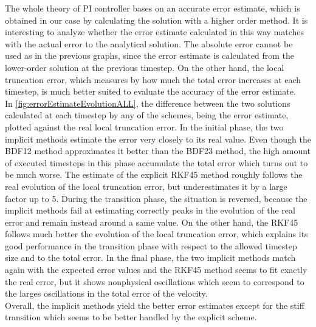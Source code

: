 The whole theory of PI controller bases on an accurate error estimate, which is obtained in our case by calculating the solution with a higher order method. It is interesting to analyze whether the error estimate calculated in this way matches with the actual error to the analytical solution. The absolute error cannot be used as in the previous graphs, since the error estimate is calculated from the lower-order solution at the previous timestep. On the other hand, the local truncation error, which measures by how much the total error increases at each timestep, is much better suited to evaluate the accuracy of the error estimate. \\
In \autoref{fig:errorEstimateEvolutionALL}, the difference between the two solutions calculated at each timestep by any of the schemes, being the error estimate, plotted against the real local truncation error. In the initial phase, the two implicit methods estimate the error very closely to its real value. Even though the BDF12 method approximates it better than the BDF23 method, the high amount of executed timesteps in this phase accumulate the total error which turns out to be much worse. The estimate of the explicit RKF45 method roughly follows the real evolution of the local truncation error, but underestimates it by a large factor up to 5. During the transition phase, the situation is reversed, because the implicit methods fail at estimating correctly peaks in the evolution of the real error and remain instead around a same value. On the other hand, the RKF45 follows much better the evolution of the local truncation error, which explains its good performance in the transition phase with respect to the allowed timestep size and to the total error. In the final phase, the two implicit methods match again with the expected error values and the RKF45 method seems to fit exactly the real error, but it shows nonphysical oscillations which seem to correspond to the larges oscillations in the total error of the velocity. \\
Overall, the implicit methods yield the better error estimates except for the stiff transition which seems to be better handled by the explicit scheme. 

